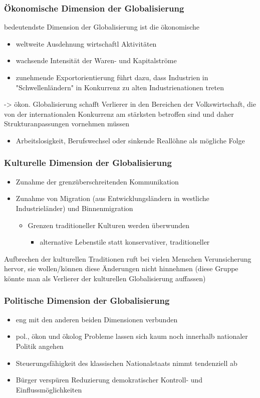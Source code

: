 \documentclass[11pt]{article}
\begin{document}
\subsubsection{Ökonomische Dimension der Globalisierung}
\label{sec:org8ca3852}
bedeutendste Dimension der Globalisierung ist die ökonomische
\begin{itemize}
\item weltweite Ausdehnung wirtschaftl Aktivitäten
\item wachsende Intensität der Waren- und Kapitalströme
\item zunehmende Exportorientierung führt dazu, dass Industrien in "Schwellenländern" in Konkurrenz zu alten Industrienationen treten
\end{itemize}

-> ökon. Globalisierung schafft Verlierer in den Bereichen der Volkswirtschaft, die von der internationalen Konkurrenz am stärksten betroffen sind und daher Strukturanpassungen vornehmen müssen
\begin{itemize}
\item Arbeitslosigkeit, Berufswechsel oder sinkende Reallöhne als mögliche Folge
\end{itemize}
\subsubsection{Kulturelle Dimension der Globalisierung}
\label{sec:org612fc6f}
\begin{itemize}
\item Zunahme der grenzüberschreitenden Kommunikation
\item Zunahme von Migration (aus Entwicklungsländern in westliche Industrieländer) und Binnenmigration
\begin{itemize}
\item Grenzen traditioneller Kulturen werden überwunden
\begin{itemize}
\item alternative Lebenstile statt konservativer, traditioneller
\end{itemize}
\end{itemize}
\end{itemize}

Aufbrechen der kulturellen Traditionen ruft bei vielen Menschen Verunsicherung hervor, sie wollen/können diese Änderungen nicht hinnehmen (diese Gruppe könnte man als Verlierer der kulturellen Globalisierung auffassen)
\subsubsection{Politische Dimension der Globalisierung}
\label{sec:org77af454}
\begin{itemize}
\item eng mit den anderen beiden Dimensionen verbunden
\item pol., ökon und ökolog Probleme lassen sich kaum noch innerhalb nationaler Politik angehen
\item Steuerungsfähigkeit des klassischen Nationalstaats nimmt tendenziell ab
\item Bürger verspüren Reduzierung demokratischer Kontroll- und Einflussmöglichkeiten
\end{itemize}
\end{document}
